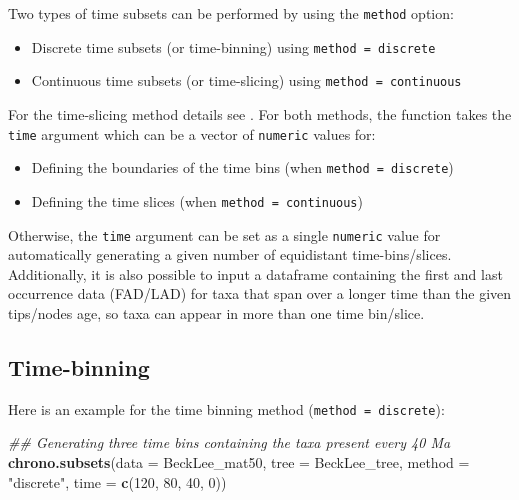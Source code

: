 \documentclass[
]{book}
\newenvironment{Shaded}{\begin{snugshade}}{\end{snugshade}}
\newcommand{\CommentTok}[1]{\textcolor[rgb]{0.56,0.35,0.01}{\textit{#1}}}
\newcommand{\DataTypeTok}[1]{\textcolor[rgb]{0.13,0.29,0.53}{#1}}
\newcommand{\DecValTok}[1]{\textcolor[rgb]{0.00,0.00,0.81}{#1}}
\newcommand{\KeywordTok}[1]{\textcolor[rgb]{0.13,0.29,0.53}{\textbf{#1}}}
\newcommand{\NormalTok}[1]{#1}
\newcommand{\StringTok}[1]{\textcolor[rgb]{0.31,0.60,0.02}{#1}}
\providecommand{\tightlist}{%
  \setlength{\itemsep}{0pt}\setlength{\parskip}{0pt}}
\begin{document}
Two types of time subsets can be performed by using the \texttt{method} option:

\begin{itemize}
\tightlist
\item
  Discrete time subsets (or time-binning) using \texttt{method\ =\ discrete}
\item
  Continuous time subsets (or time-slicing) using \texttt{method\ =\ continuous}
\end{itemize}

For the time-slicing method details see \citet{time-slice}.
For both methods, the function takes the \texttt{time} argument which can be a vector of \texttt{numeric} values for:

\begin{itemize}
\tightlist
\item
  Defining the boundaries of the time bins (when \texttt{method\ =\ discrete})
\item
  Defining the time slices (when \texttt{method\ =\ continuous})
\end{itemize}

Otherwise, the \texttt{time} argument can be set as a single \texttt{numeric} value for automatically generating a given number of equidistant time-bins/slices.
Additionally, it is also possible to input a dataframe containing the first and last occurrence data (FAD/LAD) for taxa that span over a longer time than the given tips/nodes age, so taxa can appear in more than one time bin/slice.

\hypertarget{time-binning}{%
\subsection{Time-binning}\label{time-binning}}

Here is an example for the time binning method (\texttt{method\ =\ discrete}):

\begin{Shaded}
\begin{Highlighting}[]
\CommentTok{\#\# Generating three time bins containing the taxa present every 40 Ma}
\KeywordTok{chrono.subsets}\NormalTok{(}\DataTypeTok{data =}\NormalTok{ BeckLee\_mat50, }\DataTypeTok{tree =}\NormalTok{ BeckLee\_tree,}
               \DataTypeTok{method =} \StringTok{"discrete"}\NormalTok{,}
               \DataTypeTok{time =} \KeywordTok{c}\NormalTok{(}\DecValTok{120}\NormalTok{, }\DecValTok{80}\NormalTok{, }\DecValTok{40}\NormalTok{, }\DecValTok{0}\NormalTok{))}
\end{Highlighting}
\end{Shaded}
\end{document}
